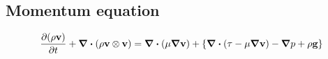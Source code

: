 
\subsection{Momentum equation}

\begin{equation}
	\pdv{(\rho \vb{v})}{t} + \div(\rho \vb{v} \otimes \vb{v}) = 
	\div(\mu \grad{\vb{v}}) + \left\{ \div(\vb{\tau - \mu \grad{\vb{v}}}) - \grad{p} + \rho \vb{g} \right\}
\end{equation}






